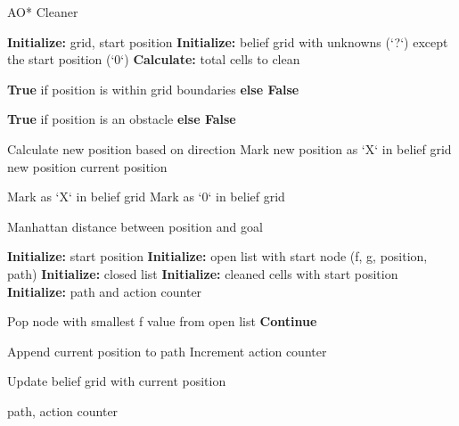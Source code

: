 \documentclass{article}
\begin{document}
  \begin{algorithm}[H]
    \caption{AO* Cleaner}
    \begin{algorithmic}[1]
    \State \textbf{Initialize:} grid, start position
    \State \textbf{Initialize:} belief grid with unknowns (`?`) except the start position (`0`)
    \State \textbf{Calculate:} total cells to clean
    
        \State \Return \textbf{True} if position is within grid boundaries \textbf{else False}
    \EndFunction
    
        \State \Return \textbf{True} if position is an obstacle \textbf{else False}
    \EndFunction
    
        \State Calculate new position based on direction
                \State Mark new position as `X` in belief grid
            \EndIf
            \State \Return new position
        \EndIf
        \State \Return current position
    \EndFunction
    
            \State Mark as `X` in belief grid
        \Else
            \State Mark as `0` in belief grid
        \EndIf
    \EndFunction
    
        \State \Return Manhattan distance between position and goal
    \EndFunction
    
        \State \textbf{Initialize:} start position
        \State \textbf{Initialize:} open list with start node (f, g, position, path)
        \State \textbf{Initialize:} closed list
        \State \textbf{Initialize:} cleaned cells with start position
        \State \textbf{Initialize:} path and action counter
    
            \State Pop node with smallest f value from open list
                \State \textbf{Continue}
            \EndIf
    
            \State Append current position to path
            \State Increment action counter
    
            \State Update belief grid with current position
    
                \State \Return path, action counter
            \EndIf
    

\end{algorithmic}
\end{algorithm}
\end{document}
